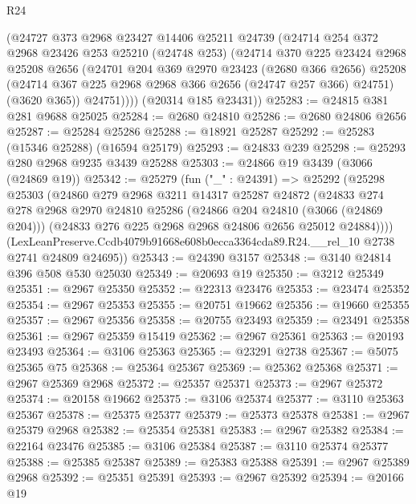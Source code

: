 \begin{lexlean}{R24}
\begin{coremodule}
        (@24727
          @373
          @2968
          @23427
          @14406
          @25211
          @24739
          (@24714
            @254
            @372
            @2968
            @23426
            @253
            @25210
            (@24748 @253)
            (@24714
              @370
              @225
              @23424
              @2968
              @25208
              @2656
              (@24701
                @204
                @369
                @2970
                @23423
                (@2680 @366 @2656)
                @25208
                (@24714 @367 @225 @2968 @2968 @366 @2656 (@24747 @257 @366) @24751)
                (@3620 @365))
              @24751))))
      (@20314 @185 @23431))
@25283 := @24815 @381 @281 @9688 @25025
@25284 := @2680 @24810
@25286 := @2680 @24806 @2656
@25287 := @25284 @25286
@25288 := @18921 @25287
@25292 := @25283 (@15346 @25288) (@16594 @25179)
@25293 := @24833 @239
@25298 := @25293 @280 @2968 @9235 @3439 @25288
@25303 := @24866 @19 @3439 (@3066 (@24869 @19))
@25342 := @25279
    (fun ("_" : @24391) =>
    @25292
      (@25298
        @25303
        (@24860
          @279
          @2968
          @3211
          @14317
          @25287
          @24872
          (@24833
            @274
            @278
            @2968
            @2970
            @24810
            @25286
            (@24866 @204 @24810 (@3066 (@24869 @204)))
            (@24833 @276 @225 @2968 @2968 @24806 @2656 @25012 @24884))))
      (LexLeanPreserve.Ccdb4079b91668e608b0ecca3364cda89.R24.__rel_10 @2738 @2741 @24809 @24695))
@25343 := @24390 @3157
@25348 := @3140 @24814 @396 @508 @530 @25030
@25349 := @20693 @19
@25350 := @3212 @25349
@25351 := @2967 @25350
@25352 := @22313 @23476
@25353 := @23474 @25352
@25354 := @2967 @25353
@25355 := @20751 @19662
@25356 := @19660 @25355
@25357 := @2967 @25356
@25358 := @20755 @23493
@25359 := @23491 @25358
@25361 := @2967 @25359 @15419
@25362 := @2967 @25361
@25363 := @20193 @23493
@25364 := @3106 @25363
@25365 := @23291 @2738
@25367 := @5075 @25365 @75
@25368 := @25364 @25367
@25369 := @25362 @25368
@25371 := @2967 @25369 @2968
@25372 := @25357 @25371
@25373 := @2967 @25372
@25374 := @20158 @19662
@25375 := @3106 @25374
@25377 := @3110 @25363 @25367
@25378 := @25375 @25377
@25379 := @25373 @25378
@25381 := @2967 @25379 @2968
@25382 := @25354 @25381
@25383 := @2967 @25382
@25384 := @22164 @23476
@25385 := @3106 @25384
@25387 := @3110 @25374 @25377
@25388 := @25385 @25387
@25389 := @25383 @25388
@25391 := @2967 @25389 @2968
@25392 := @25351 @25391
@25393 := @2967 @25392
@25394 := @20166 @19

\end{coremodule}
\end{lexlean}
